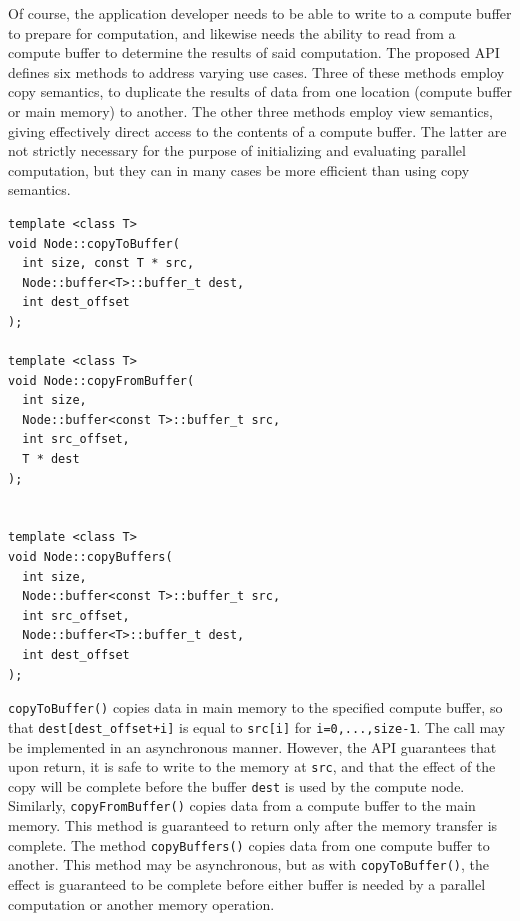 \documentclass[10pt,conference,letterpaper]{IEEEtran}
\begin{document}
Of course, the application developer needs to be able to write to a compute buffer to prepare for computation, and likewise needs the ability to read from a compute buffer to determine the results of said computation. The proposed API defines six methods to address varying use cases. Three of these methods employ copy semantics, to duplicate the results of data from one location (compute buffer or main memory) to another. The other three methods employ view semantics, giving effectively direct access to the contents of a compute buffer. The latter are not strictly necessary for the purpose of initializing and evaluating parallel computation, but they can in many cases be more efficient than using copy semantics.

{\small \begin{verbatim}
template <class T>
void Node::copyToBuffer(
  int size, const T * src,
  Node::buffer<T>::buffer_t dest, 
  int dest_offset
);                    

template <class T>
void Node::copyFromBuffer(
  int size, 
  Node::buffer<const T>::buffer_t src, 
  int src_offset,
  T * dest
);                    


template <class T>
void Node::copyBuffers(
  int size, 
  Node::buffer<const T>::buffer_t src, 
  int src_offset,
  Node::buffer<T>::buffer_t dest, 
  int dest_offset
);                    
\end{verbatim}}
\verb!copyToBuffer()! copies data in main memory to the specified compute buffer, so that \verb!dest[dest_offset+i]! is equal to \verb!src[i]! for \verb!i=0,...,size-1!. The call may be implemented in an asynchronous manner. However, the API guarantees that upon return, it is safe to write to the memory at \verb!src!, and that the effect of the copy will be complete before the buffer \verb!dest! is used by the compute node. Similarly, \verb!copyFromBuffer()! copies data from a compute buffer to the main memory. This method is guaranteed to return only after the memory transfer is complete. The method \verb!copyBuffers()! copies data from one compute buffer to another. This method may be asynchronous, but as with \verb!copyToBuffer()!, the effect is guaranteed to be complete before either buffer is needed by a parallel computation or another memory operation.
\end{document}
